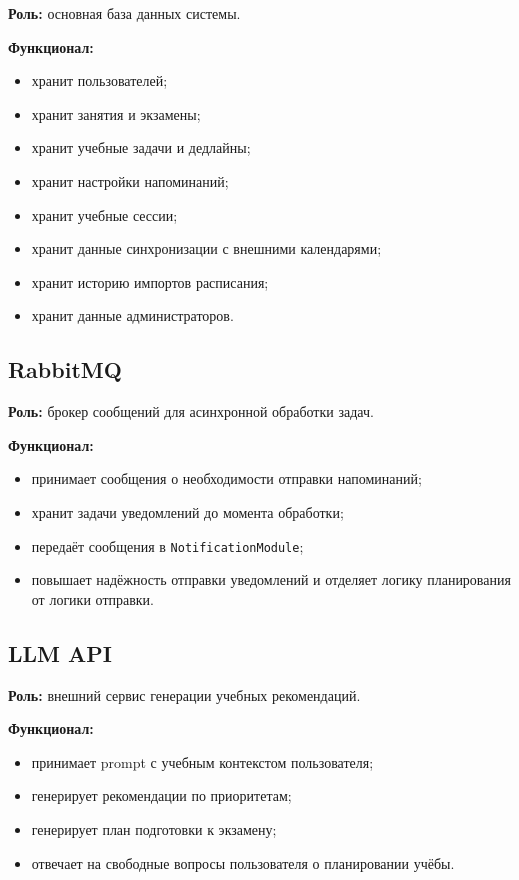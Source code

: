 \documentclass[10pt,a4paper,final]{article} %
\begin{document}
\textbf{Роль:} основная база данных системы.

\textbf{Функционал:}
\begin{itemize}
    \item хранит пользователей;
    \item хранит занятия и экзамены;
    \item хранит учебные задачи и дедлайны;
    \item хранит настройки напоминаний;
    \item хранит учебные сессии;
    \item хранит данные синхронизации с внешними календарями;
    \item хранит историю импортов расписания;
    \item хранит данные администраторов.
\end{itemize}

\subsection{RabbitMQ}

\textbf{Роль:} брокер сообщений для асинхронной обработки задач.

\textbf{Функционал:}
\begin{itemize}
    \item принимает сообщения о необходимости отправки напоминаний;
    \item хранит задачи уведомлений до момента обработки;
    \item передаёт сообщения в \texttt{NotificationModule};
    \item повышает надёжность отправки уведомлений и отделяет логику
    планирования от логики отправки.
\end{itemize}

\subsection{LLM API}

\textbf{Роль:} внешний сервис генерации учебных рекомендаций.

\textbf{Функционал:}
\begin{itemize}
    \item принимает prompt с учебным контекстом пользователя;
    \item генерирует рекомендации по приоритетам;
    \item генерирует план подготовки к экзамену;
    \item отвечает на свободные вопросы пользователя о планировании учёбы.
\end{itemize}
\end{document}
